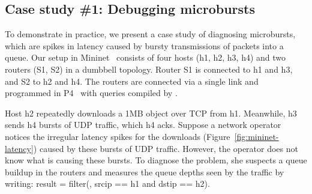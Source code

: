 \subsection{Case study \#1: Debugging microbursts}
\label{s:eval:mininet}
\label{sec:eval:mininet}

To demonstrate \TheSystem in practice, we present a case study of diagnosing
microbursts, which are spikes in latency caused by bursty transmissions of
packets into a queue.  Our setup in Mininet~\cite{mininet} consists of
four hosts ({\ct h1, h2, h3, h4}) and two routers ({\ct S1, S2}) in a dumbbell
topology.  Router {\ct S1} is connected to {\ct h1} and {\ct h3}, and {\ct S2}
to {\ct h2} and {\ct h4}.  The routers are connected via a single link and
programmed in P4~\cite{p4-bmv2} with queries compiled by \TheSystem.

Host {\ct h2} repeatedly downloads a 1MB object over TCP from {\ct h1}.
Meanwhile, {\ct h3} sends {\ct h4} bursts of UDP traffic, which {\ct h4} acks.
Suppose a network operator notices the irregular latency spikes for the
downloads (Figure~\ref{fig:mininet-latency}) caused by these bursts of UDP
traffic.  However, the operator does not know what is causing these bursts. To
diagnose the problem, she suspects a queue buildup in the routers and measures
the queue depths seen by the traffic by writing: {\ct result = filter(\pktlog,
srcip == h1 and dstip == h2).}



